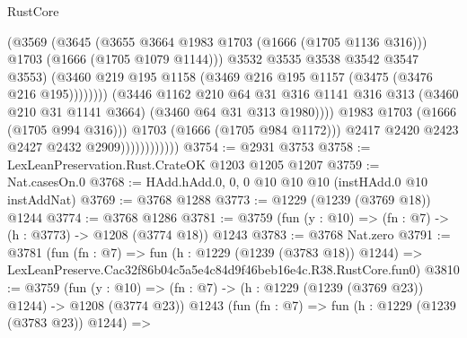 \begin{lexlean}{RustCore}
\begin{coremodule}
                                            (@3569
                                              (@3645
                                                (@3655 @3664 @1983 @1703 (@1666 (@1705 @1136 @316)))
                                                @1703
                                                (@1666 (@1705 @1079 @1144)))
                                              @3532
                                              @3535
                                              @3538
                                              @3542
                                              @3547
                                              @3553)
                                            (@3460
                                              @219
                                              @195
                                              @1158
                                              (@3469 @216 @195 @1157 (@3475 (@3476 @216 @195))))))))
                                    (@3446
                                      @1162
                                      @210
                                      @64
                                      @31
                                      @316
                                      @1141
                                      @316
                                      @313
                                      (@3460 @210 @31 @1141 @3664)
                                      (@3460 @64 @31 @313 @1980))))
                                @1983
                                @1703
                                (@1666 (@1705 @994 @316)))
                              @1703
                              (@1666 (@1705 @984 @1172)))
                            @2417
                            @2420
                            @2423
                            @2427
                            @2432
                            @2909))))))))))))
@3754 := @2931 @3753
@3758 := LexLeanPreservation.Rust.CrateOK @1203 @1205 @1207
@3759 := Nat.casesOn.{0}
@3768 := HAdd.hAdd.{0, 0, 0} @10 @10 @10 (instHAdd.{0} @10 instAddNat)
@3769 := @3768 @1288
@3773 := @1229 (@1239 (@3769 @18)) @1244
@3774 := @3768 @1286
@3781 := @3759 (fun (y : @10) => (fn : @7) -> (h : @3773) -> @1208 (@3774 @18)) @1243
@3783 := @3768 Nat.zero
@3791 := @3781
    (fun (fn : @7) =>
    fun (h : @1229 (@1239 (@3783 @18)) @1244) =>
    LexLeanPreserve.Cac32f86b04c5a5e4c84d9f46beb16e4c.R38.RustCore.fun0)
@3810 := @3759
    (fun (y : @10) => (fn : @7) -> (h : @1229 (@1239 (@3769 @23)) @1244) -> @1208 (@3774 @23))
    @1243
    (fun (fn : @7) =>
    fun (h : @1229 (@1239 (@3783 @23)) @1244) =>

\end{coremodule}
\end{lexlean}
